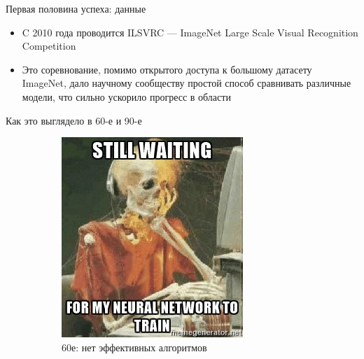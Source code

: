 \documentclass[aspectratio=169]{beamer}
\begin{document}
\begin{frame}{Первая половина успеха: данные}
    \begin{itemize}
        \item C 2010 года проводится ILSVRC --- ImageNet Large Scale Visual
        Recognition Competition
        \item Это соревнование, помимо открытого доступа к большому датасету
        ImageNet, дало научному сообществу простой способ сравнивать
        различные модели, что сильно ускорило прогресс в области
    \end{itemize}
\end{frame}

\begin{frame}{Как это выглядело в 60-е и 90-е}
    \begin{figure}
        \begin{subfigure}{.49\linewidth}
            \centering
            \includegraphics[width=.76\linewidth]{graphs/fig21_0.jpg}
            \caption*{60е: нет эффективных алгоритмов}
        \end{subfigure}
        \pause{}
        \begin{subfigure}{.49\linewidth}
            \centering

\end{subfigure}
\end{figure}
\end{frame}
\end{document}
